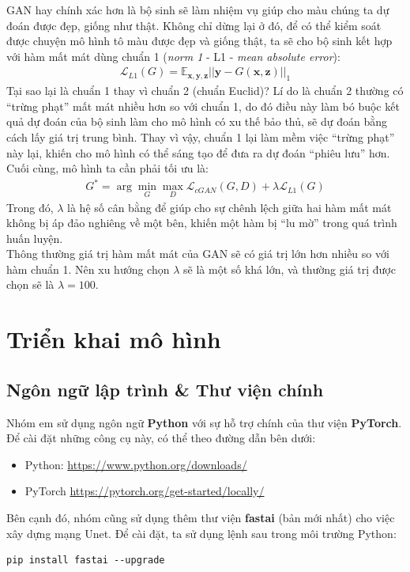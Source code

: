 \documentclass[a4paper]{article}
\begin{document}
\noindent
GAN hay chính xác hơn là bộ sinh sẽ làm nhiệm vụ giúp cho màu chúng ta dự đoán được đẹp, giống như thật. Không chỉ dừng lại ở đó, để có thể kiểm soát được chuyện mô hình tô màu được đẹp và giống thật, ta sẽ cho bộ sinh kết hợp với hàm mất mát dùng chuẩn 1 (\textit{norm 1} - L1 - \textit{mean absolute error}):
\begin{align*}
    \mathcal{L}_{L1}(G) = \mathbb{E}_{\mathbf{x}, \mathbf{y}, \mathbf{z}}\left|\left|\mathbf{y} - G(\mathbf{x}, \mathbf{z})\right|\right|_1
\end{align*}
Tại sao lại là chuẩn 1 thay vì chuẩn 2 (chuẩn Euclid)? Lí do là chuẩn 2 thường có ``trừng phạt'' mất mát nhiều hơn so với chuẩn 1, do đó điều này làm bó buộc kết quả dự đoán của bộ sinh làm cho mô hình có xu thế bảo thủ, sẽ dự đoán bằng cách lấy giá trị trung bình. Thay vì vậy, chuẩn 1 lại làm mềm việc ``trừng phạt'' này lại, khiến cho mô hình có thể sáng tạo để đưa ra dự đoán ``phiêu lưu'' hơn. \\
Cuối cùng, mô hình ta cần phải tối ưu là:
\begin{align*}
    G^* = \arg\underset{G}{\min}\underset{D}{\max}\mathcal{L}_{cGAN}(G, D) + \lambda \mathcal{L}_{L1}(G)
\end{align*}
Trong đó, $\lambda$ là hệ số cân bằng để giúp cho sự chênh lệch giữa hai hàm mất mát không bị áp đảo nghiêng về một bên, khiến một hàm bị ``lu mờ'' trong quá trình huấn luyện.\\
Thông thường giá trị hàm mất mát của GAN sẽ có giá trị lớn hơn nhiều so với hàm chuẩn 1. Nên xu hướng chọn $\lambda$ sẽ là một số khá lớn, và thường giá trị được chọn sẽ là $\lambda = 100$.

\section{Triển khai mô hình}

\subsection{Ngôn ngữ lập trình \& Thư viện chính}
Nhóm em sử dụng ngôn ngữ \textbf{Python} với sự hỗ trợ chính của thư viện \textbf{PyTorch}. Để cài đặt những công cụ này, có thể theo đường dẫn bên dưới:
\begin{itemize}
    \item Python: \href{https://www.python.org/downloads/}{https://www.python.org/downloads/}
    \item PyTorch \href{https://pytorch.org/get-started/locally/}{https://pytorch.org/get-started/locally/}
\end{itemize}
Bên cạnh đó, nhóm cũng sử dụng thêm thư viện \textbf{fastai} (bản mới nhất) cho việc xây dựng mạng Unet. Để cài đặt, ta sử dụng lệnh sau trong môi trường Python:
\begin{lstlisting}
pip install fastai --upgrade
\end{lstlisting}
\end{document}
